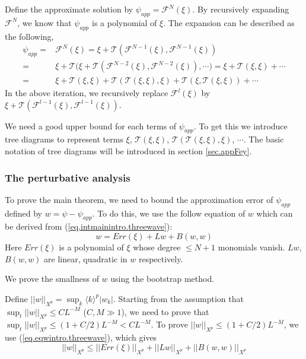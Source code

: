 Define the approximate solution by $\psi_{app}=\mathcal{F}^{N}(\xi)$. By recursively expanding  $\mathcal{F}^{N}$, we know that $\psi_{app}$ is a polynomial of $\xi$.
The expansion can be described as the following,
\begin{equation*}
\begin{split}
    \psi_{app}=&\mathcal{F}^{N}(\xi)=\xi+\mathcal{T}(\mathcal{F}^{N-1}(\xi),\mathcal{F}^{N-1}(\xi))
    \\
    =&\xi+\mathcal{T}\Big(\xi+\mathcal{T}(\mathcal{F}^{N-2}(\xi),\mathcal{F}^{N-2}(\xi)),
    \cdots\Big)=\xi+\mathcal{T}(\xi,\xi)+\cdots
    \\
    =&\xi+\mathcal{T}(\xi,\xi)+\mathcal{T}(\mathcal{T}(\xi,\xi),\xi)
    +\mathcal{T}(\xi,\mathcal{T}(\xi,\xi))+\cdots
\end{split}    
\end{equation*}
In the above iteration, we recursively replace $\mathcal{F}^{l}(\xi)$ by $\xi+\mathcal{T}(\mathcal{F}^{l-1}(\xi),\mathcal{F}^{l-1}(\xi))$.

We need a good upper bound for each terms of $\psi_{app}$. To get this we introduce tree diagrams to represent terms $\xi$, $\mathcal{T}(\xi,\xi)$, $\mathcal{T}(\mathcal{T}(\xi,\xi),\xi)$, $\cdots$. The basic notation of tree diagrams will be introduced in section \ref{sec.appFey}.

\subsubsection{The perturbative analysis}\label{sec.pert intro} To prove the main theorem, we need to bound the approximation error of $\psi_{app}$ defined by $w=\psi-\psi_{app}$. To do this, we use the follow equation of $w$ which can be derived from (\ref{eq.intmainintro.threewave}):
\begin{equation}\label{eq.eqwintro.threewave}
    w= Err(\xi)+Lw+B(w,w)
\end{equation}
Here $Err(\xi)$ is a polynomial of $\xi$ whose degree $\le N+1$ monomials vanish. $Lw$, $B(w,w)$ are linear, quadratic in $w$ respectively.

We prove the smallness of $w$ using the bootstrap method.

Define $||w||_{X^p}=\sup_{k} \langle k\rangle^{p} |w_k|$. Starting from the assumption that $\sup_t||w||_{X^p}\le CL^{-M}$ ($C,M\gg 1$), we need to prove that $\sup_t||w||_{X^p}\le (1+C/2)L^{-M}<CL^{-M}$. To prove $||w||_{X^p}\le (1+C/2)L^{-M}$, we use (\ref{eq.eqwintro.threewave}), which gives
\begin{equation}\label{eq.ineqw.threewave}
    ||w||_{X^p}\le ||Err(\xi)||_{X^p}+||Lw||_{X^p}+||B(w,w)||_{X^p}
\end{equation}

